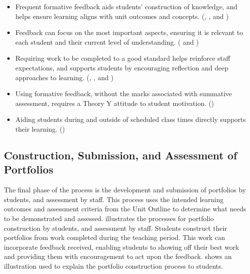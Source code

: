 \begin{itemize}[noitemsep,nolistsep]
	\item Frequent formative feedback aids students' construction of knowledge, and helps ensure learning aligns with unit outcomes and concepts. (, ,  and )
	\item Feedback can focus on the most important aspects, ensuring it is relevant to each student and their current level of understanding. ( and )
	\item Requiring work to be completed to a good standard helps reinforce staff expectations, and supports students by encouraging reflection and deep approaches to learning. (, , and )
	\item Using formative feedback, without the marks associated with summative assessment, requires a Theory Y attitude to student motivation. ()
	\item Aiding students during and outside of scheduled class times directly supports their learning. ()
\end{itemize}


\subsection{Construction, Submission, and Assessment of Portfolios} %
\label{ssub:construction_submission_and_assessment_of_portfolios}

The final phase of the process is the development and submission of portfolios by students, and assessment by staff. This process uses the intended learning outcomes and assessment criteria from the Unit Outline to determine what needs to be demonstrated and assessed.  illustrates the processes for portfolio construction by students, and assessment by staff. Students construct their portfolios from work completed during the teaching period. This work can incorporate feedback received, enabling students to showing off their best work and providing them with encouragement to act upon the feedback.  shows an illustration used to explain the portfolio construction process to students. 

